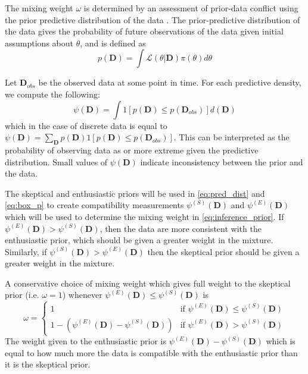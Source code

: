 \documentclass[useAMS,usenatbib,referee]{biom}
\begin{document}
The mixing weight $\omega$ is determined by an assessment of prior-data conflict using the prior predictive distribution of the data \citep{Box1980}.
The prior-predictive distribution of the data gives the probability of future observations of the data given initial assumptions about $\theta$, and is defined as
\begin{equation}\label{eq:pred_dist}
p(\mathbf{D})=\int \mathcal{L}(\theta|\mathbf{D})\pi(\theta)d\theta
\end{equation}

Let $\mathbf{D}_{obs}$ be the observed data at some point in time. For each predictive density, we compute the following:
\begin{equation}\label{eq:box_p}
\psi(\mathbf{D})=\int 1[p(\mathbf{D})\leq p(\mathbf{D}_{obs})] d(\mathbf{D})
\end{equation}
which in the case of discrete data is equal to $\psi(\mathbf{D})=\sum_{\mathbf{D}}p(\mathbf{D})1[p(\mathbf{D})\leq p(\mathbf{D}_{obs})]$.
This can be interpreted as the probability of observing data as or more extreme given the predictive distribution. Small values of $\psi(\mathbf{D})$ indicate inconsistency between the prior and the data. 

The skeptical and enthusiastic priors will be used in \eqref{eq:pred_dist} and \eqref{eq:box_p} to create compatibility measurements $\psi^{(S)}(\mathbf{D})$ and $\psi^{(E)}(\mathbf{D})$ which will be used to determine the mixing weight in \eqref{eq:inference_prior}. If $\psi^{(E)}(\mathbf{D})>\psi^{(S)}(\mathbf{D})$, then the data are more consistent with the enthusiastic prior, which should be given a greater weight in the mixture. Similarly, if $\psi^{(S)}(\mathbf{D})>\psi^{(E)}(\mathbf{D})$ then the skeptical prior should be given a greater weight in the mixture.

A conservative choice of mixing weight which gives full weight to the skeptical prior (i.e. $\omega=1$) whenever $\psi^{(E)}(\mathbf{D})\leq \psi^{(S)}(\mathbf{D})$ is
\begin{equation}\label{eq:adaptive_prior}
\omega=\begin{cases} 
      1 & \text{if }\psi^{(E)}(\mathbf{D})\leq \psi^{(S)}(\mathbf{D}) \\
      1-(\psi^{(E)}(\mathbf{D})-\psi^{(S)}(\mathbf{D})) &\text{if } \psi^{(E)}(\mathbf{D})>\psi^{(S)}(\mathbf{D})
   \end{cases}
\end{equation}
The weight given to the enthusiastic prior is $\psi^{(E)}(\mathbf{D})-\psi^{(S)}(\mathbf{D})$ which is equal to how much more the data is compatible with the enthusiastic prior than it is the skeptical prior.
%
\end{document}
